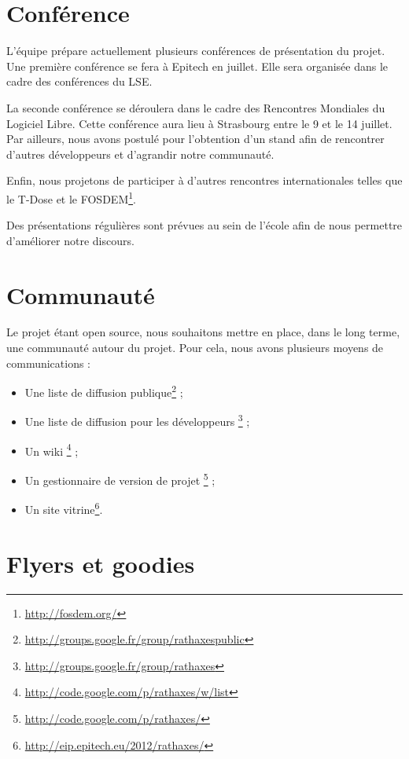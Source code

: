 \documentclass[francais]{rtxreport}
\begin{document}
\section{Conférence}
L'équipe prépare actuellement plusieurs conférences de présentation du projet.
Une première conférence se fera à Epitech en juillet. Elle sera organisée dans
le cadre des conférences du LSE.

La seconde conférence se déroulera dans le cadre des Rencontres Mondiales du
Logiciel Libre. Cette conférence aura lieu à Strasbourg entre le 9 et le 14
juillet. Par ailleurs, nous avons postulé pour l'obtention d'un stand afin de
rencontrer d'autres développeurs et d'agrandir notre communauté.

Enfin, nous projetons de participer à d'autres rencontres internationales telles
que le T-Dose et le FOSDEM\footnote{\url{http://fosdem.org/}}.

Des présentations régulières sont prévues au sein de l'école afin de nous
permettre d'améliorer notre discours.

\section{Communauté}
Le projet étant open source, nous souhaitons mettre en place, dans le long
terme, une communauté autour du projet. Pour cela, nous avons plusieurs moyens
de communications :

\begin{itemize}
\item Une liste de diffusion publique\footnote{\url{http://groups.google.fr/group/rathaxespublic}} ;
\item Une liste de diffusion pour les développeurs \footnote{\url{http://groups.google.fr/group/rathaxes}} ;
\item Un wiki \footnote{\url{http://code.google.com/p/rathaxes/w/list}} ;
\item Un gestionnaire de version de projet \footnote{\url{http://code.google.com/p/rathaxes/}} ;
\item Un site vitrine\footnote{\url{http://eip.epitech.eu/2012/rathaxes/}}.
\end{itemize}


\section{Flyers et goodies}
\end{document}
